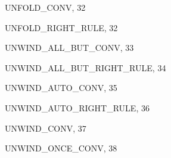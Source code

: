 \begin{theindex}
  \indexspace

  \item {\ptt UNFOLD\_CONV}, 32
  \item {\ptt UNFOLD\_RIGHT\_RULE}, 32
  \item {\ptt UNWIND\_ALL\_BUT\_CONV}, 33
  \item {\ptt UNWIND\_ALL\_BUT\_RIGHT\_RULE}, 34
  \item {\ptt UNWIND\_AUTO\_CONV}, 35
  \item {\ptt UNWIND\_AUTO\_RIGHT\_RULE}, 36
  \item {\ptt UNWIND\_CONV}, 37
  \item {\ptt UNWIND\_ONCE\_CONV}, 38

\end{theindex}
